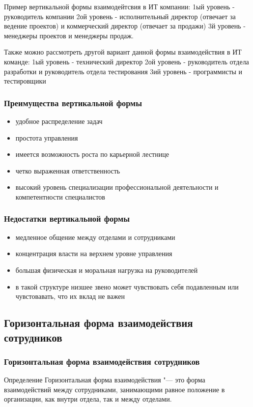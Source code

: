\documentclass{../industrial-development}
\begin{document}
\lecturenotes
Пример вертикальной формы взаимодейтсвия в ИТ компании:
1ый уровень - руководитель компании
2ой уровень - исполнительный директор (отвечает за ведение проектов) и коммерческий директор (отвечает за продажи)
3й уровень - менеджеры проектов и менеджеры продаж.

Также можно рассмотреть другой вариант данной формы взаимодействия в ИТ команде:
1ый уровень -  технический директор
2ой уровень -  руководитель отдела разработки и руководитель отдела тестирования
3ий уровень - программисты и тестировщики


\begin{frame} \frametitle{Преимущества вертикальной формы}

  
  \begin{itemize}
  \item удобное распределение задач
  \item простота управления
  \item имеется возможность роста по карьерной лестнице
  \item четко выраженная ответственность
  \item высокий уровень специализации профессиональной деятельности и компетентности специалистов

  \end{itemize}
\end{frame}


\begin{frame} \frametitle{Недостатки вертикальной формы}
  
  \begin{itemize}
  \item медленное общение между отделами и сотрудниками
  \item концентрация власти на верхнем уровне управления
  \item большая физическая и моральная нагрузка на руководителей
  \item в такой структуре низшее звено может чувствовать себя подавленным или чувстовавать, что их вклад не важен
  \end{itemize}
\end{frame}

\subsection{Горизонтальная форма взаимодействия сотрудников}

\begin{frame} \frametitle{Горизонтальная форма взаимодействия сотрудников}
  \begin{block}{Определение}
Горизонтальная форма взаимодействия "--- это форма взаимодействий между сотрудниками, занимающими равное положение в организации, как внутри отдела, так и между отделами.
  \end{block}
\end{frame}
\end{document}
